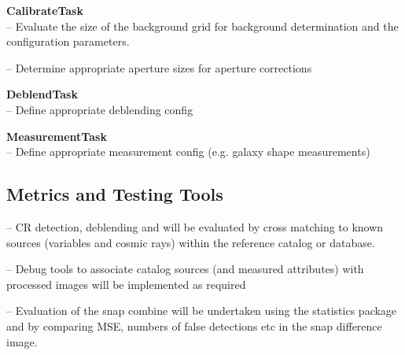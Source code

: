 \documentclass[prd, nofootinbib, floatfix, 11pt,tightenlines,times]{article}
\begin{document}


%


{\bf CalibrateTask}\\
-- Evaluate the size of the background grid for background
determination and the configuration parameters.

-- Determine appropriate  aperture sizes for aperture corrections%

{\bf DeblendTask}\\
-- Define appropriate deblending config


{\bf MeasurementTask}\\
-- Define appropriate measurement config (e.g. galaxy shape measurements)

\subsection{Metrics and Testing Tools}

-- CR detection, deblending and  will be evaluated by cross matching
to known sources (variables and cosmic rays)  within the reference
catalog or database.

-- Debug tools to associate catalog sources (and measured attributes)
with processed images will be implemented as required

-- Evaluation of the snap combine will be undertaken using the
statistics package and by comparing MSE, numbers of false detections
etc in the snap difference image.

\end{document}
